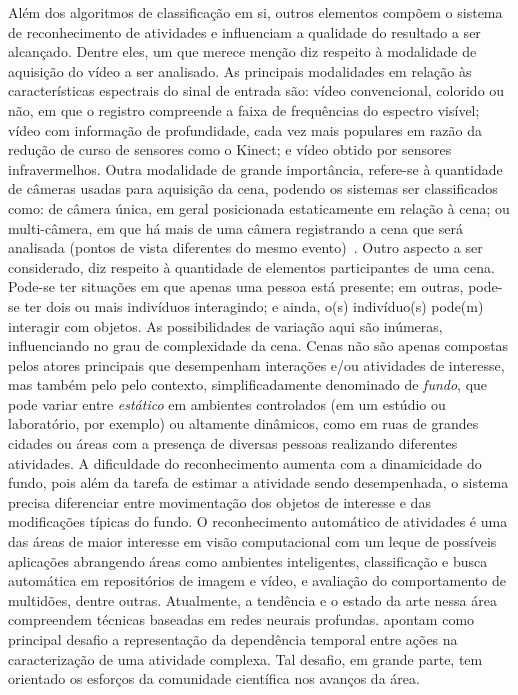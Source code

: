 Além dos algoritmos de classificação em si, outros elementos compõem o sistema de reconhecimento de atividades e influenciam a qualidade do resultado a ser alcançado. Dentre eles, um que merece menção diz respeito à modalidade de aquisição do vídeo a ser analisado. As principais modalidades em relação às características espectrais do sinal de entrada são: vídeo convencional, colorido ou não, em que o registro compreende a faixa de frequências do espectro visível; vídeo com informação de profundidade, cada vez mais populares em razão da redução de curso de sensores como o Kinect; e vídeo obtido por sensores infravermelhos. Outra modalidade de grande importância, refere-se à quantidade de câmeras usadas para aquisição da cena, podendo os sistemas ser classificados como: de câmera única, em geral posicionada estaticamente em relação à cena; ou multi-câmera, em que há mais de uma câmera registrando a cena que será analisada (pontos de vista diferentes do mesmo evento)~\parencite{yao-2019}.
%
Outro aspecto a ser considerado, diz respeito à quantidade de elementos participantes de uma cena. Pode-se ter situações em que apenas uma pessoa está presente; em outras, pode-se ter dois ou mais indivíduos interagindo; e ainda, o(s) indivíduo(s) pode(m) interagir com objetos. As possibilidades de variação aqui são inúmeras, influenciando no grau de complexidade da cena.
Cenas não são apenas compostas pelos atores principais que desempenham interações e/ou atividades de interesse, mas também pelo pelo contexto, simplificadamente denominado de \emph{fundo}, que pode variar entre \emph{estático} em ambientes controlados (em um estúdio ou laboratório, por exemplo) ou altamente dinâmicos, como em ruas de grandes cidades ou áreas com a presença de diversas pessoas realizando diferentes atividades. A dificuldade do reconhecimento aumenta com a dinamicidade do fundo, pois além da tarefa de estimar a atividade sendo desempenhada, o sistema precisa diferenciar entre movimentação dos objetos de interesse e das modificações típicas do fundo.
O reconhecimento automático de atividades é uma das áreas de maior interesse em visão computacional com um leque de possíveis aplicações abrangendo áreas como ambientes inteligentes, classificação e busca automática em repositórios de imagem e vídeo, e avaliação do comportamento de multidões, dentre outras.
%
Atualmente, a tendência e o estado da arte nessa área compreendem técnicas baseadas em redes neurais profundas. \textcite{yao-2019} apontam como principal desafio a representação da dependência temporal entre ações na caracterização de uma atividade complexa. Tal desafio, em grande parte, tem orientado os esforços da comunidade científica nos avanços da área. 
